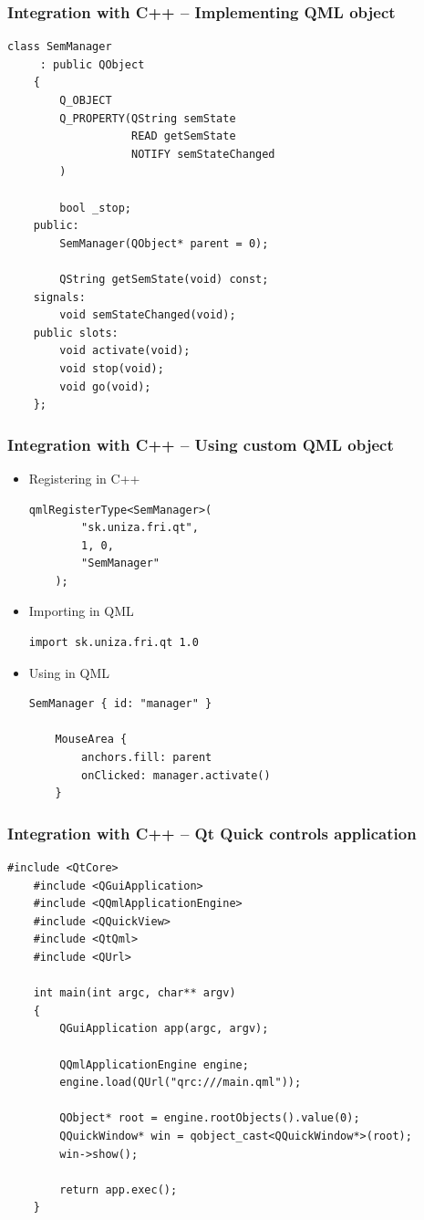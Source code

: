  \begin{frame}[fragile]
  \frametitle{Integration with C++ -- Implementing QML object}
  \begin{lstlisting}[basicstyle=\scriptsize\ttfamily]
	class SemManager
 	 : public QObject
	{
	    Q_OBJECT
	    Q_PROPERTY(QString semState
	               READ getSemState
	               NOTIFY semStateChanged
	    )

	    bool _stop;
	public:
	    SemManager(QObject* parent = 0);

	    QString getSemState(void) const;
	signals:
	    void semStateChanged(void);
	public slots:
	    void activate(void);
	    void stop(void);
	    void go(void);
	};
  \end{lstlisting}
\end{frame}

 \begin{frame}[fragile]
  \frametitle{Integration with C++ -- Using custom QML object}
  \begin{itemize}
  \item Registering in C++
  \begin{lstlisting}[basicstyle=\scriptsize\ttfamily]
	qmlRegisterType<SemManager>(
	    "sk.uniza.fri.qt",
	    1, 0,
	    "SemManager"
	);
  \end{lstlisting}
  \item Importing in QML
  \begin{lstlisting}[basicstyle=\scriptsize\ttfamily]
	import sk.uniza.fri.qt 1.0
  \end{lstlisting}
  \item Using in QML
  \begin{lstlisting}[basicstyle=\scriptsize\ttfamily]
	SemManager { id: "manager" }

	MouseArea {
	    anchors.fill: parent
	    onClicked: manager.activate()
	}
  \end{lstlisting}
  \end{itemize}
\end{frame}

 \begin{frame}[fragile]
  \frametitle{Integration with C++ -- Qt Quick controls application}
  \begin{lstlisting}[basicstyle=\scriptsize\ttfamily]
	#include <QtCore>
	#include <QGuiApplication>
	#include <QQmlApplicationEngine>
	#include <QQuickView>
	#include <QtQml>
	#include <QUrl>

	int main(int argc, char** argv)
	{
	    QGuiApplication app(argc, argv);

	    QQmlApplicationEngine engine;
	    engine.load(QUrl("qrc:///main.qml"));

	    QObject* root = engine.rootObjects().value(0);
	    QQuickWindow* win = qobject_cast<QQuickWindow*>(root);
	    win->show();

	    return app.exec();
	}
  \end{lstlisting}
\end{frame}

